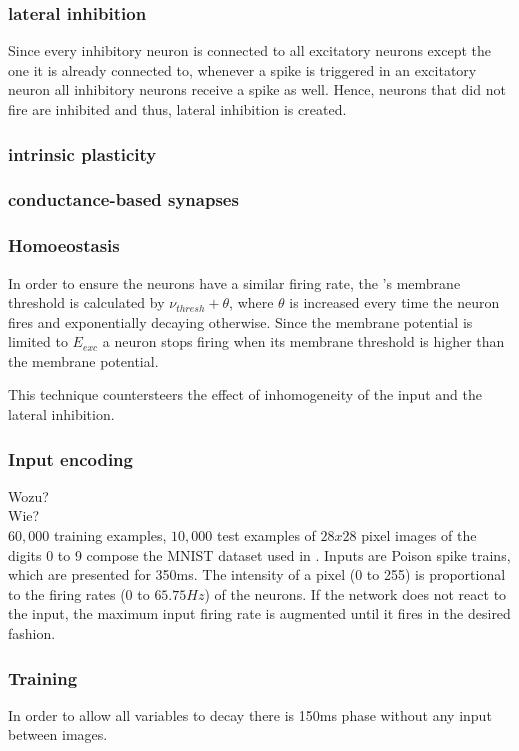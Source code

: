 \subsubsection{lateral inhibition}
Since every inhibitory neuron is connected to all excitatory neurons except the one it is already connected to, whenever a spike is triggered in an excitatory neuron all inhibitory neurons receive a spike as well.
Hence, neurons that did not fire are inhibited and thus, lateral inhibition is created.


\subsubsection{intrinsic plasticity}


\subsubsection{conductance-based synapses}


\subsubsection{Homoeostasis}
In order to ensure the neurons have a similar firing rate, the \eN{}'s membrane threshold is calculated by $\nu_{thresh} + \theta$, where $\theta$ is increased every time the neuron fires and exponentially decaying otherwise.
Since the membrane potential is limited to $E_{exc}$ a neuron stops firing when its membrane threshold is higher than the membrane potential.

This technique countersteers the effect of inhomogeneity of the input and the lateral inhibition.


\subsubsection{Input encoding}
Wozu?\\
Wie?\\
$60,000$ training examples, $10,000$ test examples of $28x28$ pixel images of the digits 0 to 9 compose the MNIST dataset used in \cite{SNN}.
Inputs are Poison spike trains, which are presented for 350ms.
The intensity of a pixel (0 to 255) is proportional to the firing rates (0 to $65.75 Hz$) of the neurons.
If the network does not react to the input, the maximum input firing rate is augmented until it fires in the desired fashion. 


\subsubsection{Training}
In order to allow all variables to decay there is 150ms phase without any input between images.

